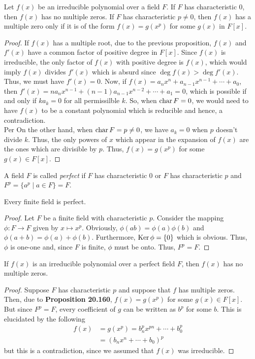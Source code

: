 \begin{proposition}
	Let $f(x)$ be an irreducible polynomial over a field $F$. If $F$ has characteristic $0$, then $f(x)$ has no multiple zeros. If $F$ has characteristic $p\ne0$, then $f(x)$ has a multiple zero only if it is of the form $f(x)=g(x^p)$ for some $g(x)$ in $F[x]$.
\end{proposition}
\begin{proof}
	If $f(x)$ has a multiple root, due to the previous proposition, $f(x)$ and $f'(x)$ have a common factor of positive degree in $F[x]$. Since $f(x)$ is irreducible, the only factor of $f(x)$ with positive degree is $f(x)$, which would imply $f(x)$ divides $f'(x)$ which is absurd since $\deg f(x)>\deg f'(x)$. Thus, we must have $f'(x)=0$. Now, if $f(x)=a_nx^n+a_{n-1}x^{n-1}+\cdots+a_0$, then $f'(x) = na_nx^{n-1}+(n-1)a_{n-1}x^{n-2}+\cdots+a_1=0$, which is possible if and only if $ka_k=0$ for all permissilble $k$. So, when $\operatorname{char} F=0$, we would need to have $f(x)$ to be a constant polynomial which is reducible and hence, a contradiction.\\
Per	On the other hand, when $\operatorname{char} F = p\ne 0$, we have $a_k=0$ when $p$ doesn't divide $k$. Thus, the only powers of $x$ which appear in the expansion of $f(x)$ are the ones which are divisible by $p$. Thus, $f(x)=g(x^p)$ for some $g(x)\in F[x]$.
\end{proof}

\begin{definition}
	A field $F$ is called \textit{perfect} if $F$ has characteristic $0$ or $F$ has characteristic $p$ and $F^p=\{a^p\mid a\in F\}=F$.
\end{definition}

\begin{theorem}
	Every finite field is perfect.
\end{theorem}
\begin{proof}
	Let $F$ be a finite field with characteristic $p$. Consider the mapping $\phi:F\to F$ given by $x\mapsto x^p$. Obviously, $\phi(ab)=\phi(a)\phi(b)$ and $\phi(a+b)=\phi(a)+\phi(b)$. Furthermore, $\operatorname{Ker}\phi=\{0\}$ which is obvious. Thus, $\phi$ is one-one and, since $F$ is finite, $\phi$ must be onto. Thus, $F^p=F$. 
\end{proof}

\begin{proposition}
	If $f(x)$ is an irreducible polynomial over a perfect field $F$, then $f(x)$ has no multiple zeros.
\end{proposition}
\begin{proof}
	Suppose $F$ has characteristic $p$ and suppose that $f$ has multiple zeros. Then, due to \textbf{Proposition 20.160}, $f(x)=g(x^p)$ for some $g(x)\in F[x]$. But since $F^p=F$, every coefficient of $g$ can be written as $b^p$ for some $b$. This is elucidated by the following
	\begin{align*}
		f(x) &= g(x^p) = b_n^px^{pn}+\cdots+b_0^p\\
		&= \left(b_nx^n+\cdots+b_0\right)^p
	\end{align*}
	but this is a contradiction, since we assumed that $f(x)$ was irreducible.
\end{proof}

